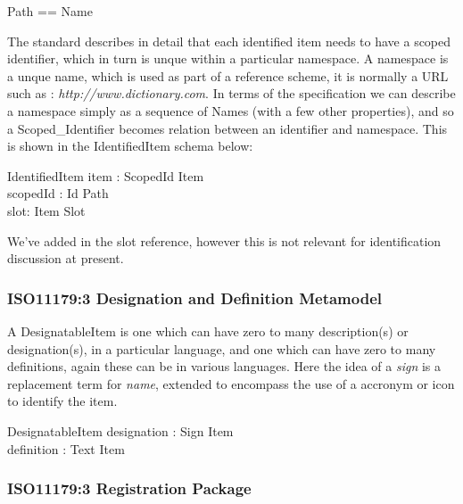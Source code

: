 \documentclass{llncs}
\begin{document}
\begin{zed}
\end{zed}
\begin{zed}
  Path == \seq Name \\
\end{zed}


The standard describes in detail that each identified item needs to have a scoped identifier, which in turn is unque within a particular namespace. A namespace is a unque name, which is used as part of a reference scheme, it is normally a URL such as : \emph{http://www.dictionary.com}. In terms of the specification we can describe a namespace simply as a sequence of Names (with a few other properties), and so a Scoped\_Identifier becomes relation between an identifier and namespace. This is shown in the IdentifiedItem schema below: 


\begin{schema}{IdentifiedItem}
  item : ScopedId \pfun Item \\
  scopedId : Id \pfun Path \\
  slot: Item \pfun Slot
\end{schema}

We've added in the slot reference, however this is not relevant for identification discussion at present.

\subsubsection{ISO11179:3 Designation and Definition Metamodel}

A DesignatableItem is one which can have zero to many description(s) or designation(s), in a particular language, and one which can have zero to many definitions, again these can be in various languages. Here the idea of a \emph{sign} is a replacement term for \emph{name}, extended to encompass the use of a accronym or icon to identify the item.
\begin{schema}{DesignatableItem}
  designation : Sign \pfun Item \\
  definition : Text \pfun Item \\
\end{schema}



\subsubsection{ISO11179:3 Registration Package}
\end{document}
